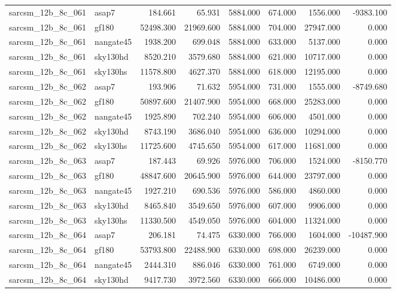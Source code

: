 \begin{tabular}{llrrrrrr}
sarcsm\_12b\_8c\_061 & asap7 & 184.661 & 65.931 & 5884.000 & 674.000 & 1556.000 & -9383.100 \\
sarcsm\_12b\_8c\_061 & gf180 & 52498.300 & 21969.600 & 5884.000 & 704.000 & 27947.000 & 0.000 \\
sarcsm\_12b\_8c\_061 & nangate45 & 1938.200 & 699.048 & 5884.000 & 633.000 & 5137.000 & 0.000 \\
sarcsm\_12b\_8c\_061 & sky130hd & 8520.210 & 3579.680 & 5884.000 & 621.000 & 10717.000 & 0.000 \\
sarcsm\_12b\_8c\_061 & sky130hs & 11578.800 & 4627.370 & 5884.000 & 618.000 & 12195.000 & 0.000 \\
sarcsm\_12b\_8c\_062 & asap7 & 193.906 & 71.632 & 5954.000 & 731.000 & 1555.000 & -8749.680 \\
sarcsm\_12b\_8c\_062 & gf180 & 50897.600 & 21407.900 & 5954.000 & 668.000 & 25283.000 & 0.000 \\
sarcsm\_12b\_8c\_062 & nangate45 & 1925.890 & 702.240 & 5954.000 & 606.000 & 4501.000 & 0.000 \\
sarcsm\_12b\_8c\_062 & sky130hd & 8743.190 & 3686.040 & 5954.000 & 636.000 & 10294.000 & 0.000 \\
sarcsm\_12b\_8c\_062 & sky130hs & 11725.600 & 4745.650 & 5954.000 & 617.000 & 11681.000 & 0.000 \\
sarcsm\_12b\_8c\_063 & asap7 & 187.443 & 69.926 & 5976.000 & 706.000 & 1524.000 & -8150.770 \\
sarcsm\_12b\_8c\_063 & gf180 & 48847.600 & 20645.900 & 5976.000 & 644.000 & 23797.000 & 0.000 \\
sarcsm\_12b\_8c\_063 & nangate45 & 1927.210 & 690.536 & 5976.000 & 586.000 & 4860.000 & 0.000 \\
sarcsm\_12b\_8c\_063 & sky130hd & 8465.840 & 3549.650 & 5976.000 & 607.000 & 9906.000 & 0.000 \\
sarcsm\_12b\_8c\_063 & sky130hs & 11330.500 & 4549.050 & 5976.000 & 604.000 & 11324.000 & 0.000 \\
sarcsm\_12b\_8c\_064 & asap7 & 206.181 & 74.475 & 6330.000 & 766.000 & 1604.000 & -10487.900 \\
sarcsm\_12b\_8c\_064 & gf180 & 53793.800 & 22488.900 & 6330.000 & 698.000 & 26239.000 & 0.000 \\
sarcsm\_12b\_8c\_064 & nangate45 & 2444.310 & 886.046 & 6330.000 & 761.000 & 6749.000 & 0.000 \\
sarcsm\_12b\_8c\_064 & sky130hd & 9417.730 & 3972.560 & 6330.000 & 666.000 & 10486.000 & 0.000 \\

\end{tabular}
